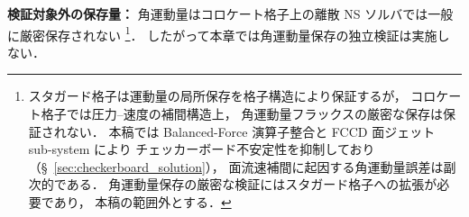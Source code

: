 \noindent\textbf{検証対象外の保存量：}
角運動量はコロケート格子上の離散 NS ソルバでは一般に厳密保存されない%
\footnote{スタガード格子は運動量の局所保存を格子構造により保証するが，
コロケート格子では圧力--速度の補間構造上，
角運動量フラックスの厳密な保存は保証されない．
本稿では Balanced-Force 演算子整合と FCCD 面ジェット sub-system により
チェッカーボード不安定性を抑制しており（§~\ref{sec:checkerboard_solution}），
面流速補間に起因する角運動量誤差は副次的である．
角運動量保存の厳密な検証にはスタガード格子への拡張が必要であり，
本稿の範囲外とする．}．
したがって本章では角運動量保存の独立検証は実施しない．
